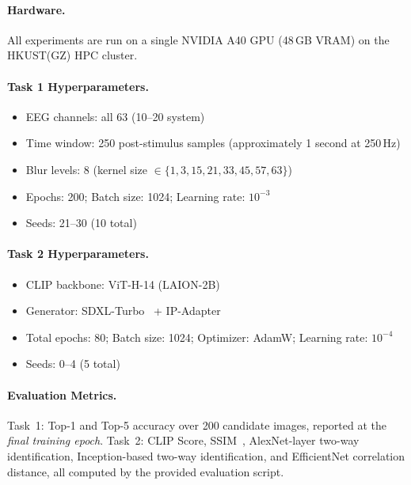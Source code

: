 \documentclass[11pt]{article}
\begin{document}
\paragraph{Hardware.}
All experiments are run on a single NVIDIA A40 GPU (48\,GB VRAM) on the HKUST(GZ) HPC cluster.

\paragraph{Task 1 Hyperparameters.}
\begin{itemize}[leftmargin=*, topsep=2pt, itemsep=1pt]
  \item EEG channels: all 63 (10--20 system)
  \item Time window: 250 post-stimulus samples (approximately 1 second at 250\,Hz)
  \item Blur levels: 8 (kernel size $ \in \{1,3,15,21,33,45,57,63\}$)
  \item Epochs: 200; Batch size: 1024; Learning rate: $10^{-3}$
  \item Seeds: 21--30 (10 total)
\end{itemize}

\paragraph{Task 2 Hyperparameters.}
\begin{itemize}[leftmargin=*, topsep=2pt, itemsep=1pt]
  \item CLIP backbone: ViT-H-14 (LAION-2B)~\citep{schuhmann2022laion}
  \item Generator: SDXL-Turbo~\citep{sauer2023sdxlturbo} + IP-Adapter~\citep{ye2023ipadapter}
  \item Total epochs: 80; Batch size: 1024; Optimizer: AdamW; Learning rate: $10^{-4}$
  \item Seeds: 0--4 (5 total)
\end{itemize}

\paragraph{Evaluation Metrics.}
Task~1: Top-1 and Top-5 accuracy over 200 candidate images, reported at the \emph{final training epoch}.
Task~2: CLIP Score, SSIM~\citep{wang2004ssim}, AlexNet-layer two-way identification, Inception-based two-way identification, and EfficientNet correlation distance, all computed by the provided evaluation script.

\end{document}
